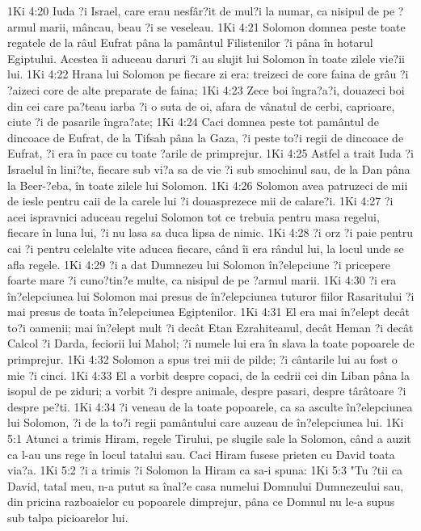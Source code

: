 1Ki 4:20  Iuda ?i Israel, care erau nesfâr?it de mul?i la numar, ca nisipul de pe ?armul marii, mâncau, beau ?i se veseleau.
1Ki 4:21  Solomon domnea peste toate regatele de la râul Eufrat pâna la pamântul Filistenilor ?i pâna în hotarul Egiptului. Acestea îi aduceau daruri ?i au slujit lui Solomon în toate zilele vie?ii lui.
1Ki 4:22  Hrana lui Solomon pe fiecare zi era: treizeci de core faina de grâu ?i ?aizeci core de alte preparate de faina;
1Ki 4:23  Zece boi îngra?a?i, douazeci boi din cei care pa?teau iarba ?i o suta de oi, afara de vânatul de cerbi, caprioare, ciute ?i de pasarile îngra?ate;
1Ki 4:24  Caci domnea peste tot pamântul de dincoace de Eufrat, de la Tifsah pâna la Gaza, ?i peste to?i regii de dincoace de Eufrat, ?i era în pace cu toate ?arile de primprejur.
1Ki 4:25  Astfel a trait Iuda ?i Israelul în lini?te, fiecare sub vi?a sa de vie ?i sub smochinul sau, de la Dan pâna la Beer-?eba, în toate zilele lui Solomon.
1Ki 4:26  Solomon avea patruzeci de mii de iesle pentru caii de la carele lui ?i douasprezece mii de calare?i.
1Ki 4:27  ?i acei ispravnici aduceau regelui Solomon tot ce trebuia pentru masa regelui, fiecare în luna lui, ?i nu lasa sa duca lipsa de nimic.
1Ki 4:28  ?i orz ?i paie pentru cai ?i pentru celelalte vite aducea fiecare, când îi era rândul lui, la locul unde se afla regele.
1Ki 4:29  ?i a dat Dumnezeu lui Solomon în?elepciune ?i pricepere foarte mare ?i cuno?tin?e multe, ca nisipul de pe ?armul marii.
1Ki 4:30  ?i era în?elepciunea lui Solomon mai presus de în?elepciunea tuturor fiilor Rasaritului ?i mai presus de toata în?elepciunea Egiptenilor.
1Ki 4:31  El era mai în?elept decât to?i oamenii; mai în?elept mult ?i decât Etan Ezrahiteanul, decât Heman ?i decât Calcol ?i Darda, feciorii lui Mahol; ?i numele lui era în slava la toate popoarele de primprejur.
1Ki 4:32  Solomon a spus trei mii de pilde; ?i cântarile lui au fost o mie ?i cinci.
1Ki 4:33  El a vorbit despre copaci, de la cedrii cei din Liban pâna la isopul de pe ziduri; a vorbit ?i despre animale, despre pasari, despre târâtoare ?i despre pe?ti.
1Ki 4:34  ?i veneau de la toate popoarele, ca sa asculte în?elepciunea lui Solomon, ?i de la to?i regii pamântului care auzeau de în?elepciunea lui.
1Ki 5:1  Atunci a trimis Hiram, regele Tirului, pe slugile sale la Solomon, când a auzit ca l-au uns rege în locul tatalui sau. Caci Hiram fusese prieten cu David toata via?a.
1Ki 5:2  ?i a trimis ?i Solomon la Hiram ca sa-i spuna:
1Ki 5:3  "Tu ?tii ca David, tatal meu, n-a putut sa înal?e casa numelui Domnului Dumnezeului sau, din pricina razboaielor cu popoarele dimprejur, pâna ce Domnul nu le-a supus sub talpa picioarelor lui.
